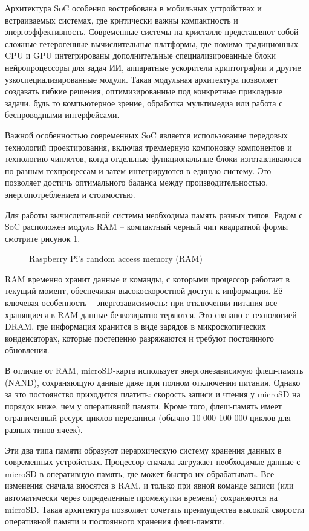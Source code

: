 Архитектура SoC особенно востребована в мобильных устройствах и встраиваемых системах, где критически важны компактность и энергоэффективность. Современные системы на кристалле представляют собой сложные гетерогенные вычислительные платформы, где помимо традиционных CPU и GPU интегрированы дополнительные специализированные блоки нейропроцессоры для задач ИИ, аппаратные ускорители криптографии и другие узкоспециализированные модули. Такая модульная архитектура позволяет создавать гибкие решения, оптимизированные под конкретные прикладные задачи, будь то компьютерное зрение, обработка мультимедиа или работа с беспроводными интерфейсами.

Важной особенностью современных SoC является использование передовых технологий проектирования, включая трехмерную компоновку компонентов и технологию чиплетов, когда отдельные функциональные блоки изготавливаются по разным техпроцессам и затем интегрируются в единую систему. Это позволяет достичь оптимального баланса между производительностью, энергопотреблением и стоимостью. 

Для работы вычислительной системы необходима память разных типов. Рядом с SoC расположен модуль RAM -- компактный черный чип квадратной формы смотрите рисунок \ref{fig:ram}.

\begin{figure}[H]
	\centering
	\caption{Raspberry Pi’s random access memory (RAM)}
	\label{fig:ram}
\end{figure}

 RAM временно хранит данные и команды, с которыми процессор работает в текущий момент, обеспечивая высокоскоростной доступ к информации. Её ключевая особенность -- энергозависимость: при отключении питания все хранящиеся в RAM данные безвозвратно теряются. Это связано с технологией  DRAM, где информация хранится в виде зарядов в микроскопических конденсаторах, которые постепенно разряжаются и требуют постоянного обновления.

В отличие от RAM, microSD-карта использует энергонезависимую флеш-память (NAND), сохраняющую данные даже при полном отключении питания. Однако за это постоянство приходится платить: скорость записи и чтения у microSD на порядок ниже, чем у оперативной памяти. Кроме того, флеш-память имеет ограниченный ресурс циклов перезаписи (обычно 10 000-100 000 циклов для разных типов ячеек).

Эти два типа памяти образуют иерархическую систему хранения данных в современных устройствах. Процессор сначала загружает необходимые данные с microSD в оперативную память, где может быстро их обрабатывать. Все изменения сначала вносятся в RAM, и только при явной команде записи (или автоматически через определенные промежутки времени) сохраняются на microSD. Такая архитектура позволяет сочетать преимущества высокой скорости оперативной памяти и постоянного хранения флеш-памяти.


